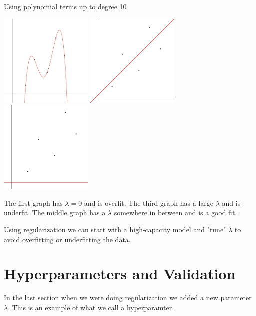 \begin{example}
    Using polynomial terms up to degree 10
    \begin{center}
        \includegraphics[width=1.75in]{images/Chapter7/Overfit.png}
        \includegraphics[width=1.75in]{images/Chapter7/Good Fit.png}
        \includegraphics[width=1.75in]{images/Chapter7/Underfit.png}
    \end{center}
    The first graph has $\lambda=0$ and is overfit. The third graph has a large $\lambda$ and is underfit. The middle graph has a $\lambda$ somewhere in between and is a good fit.
\end{example}

Using regularization we can start with a high-capacity model and "tune" $\lambda$ to avoid overfitting or underfitting the data.

\section{Hyperparameters and Validation}

In the last section when we were doing regularization we added a new parameter $\lambda$. This is an example of what we call a hyperparamter.

